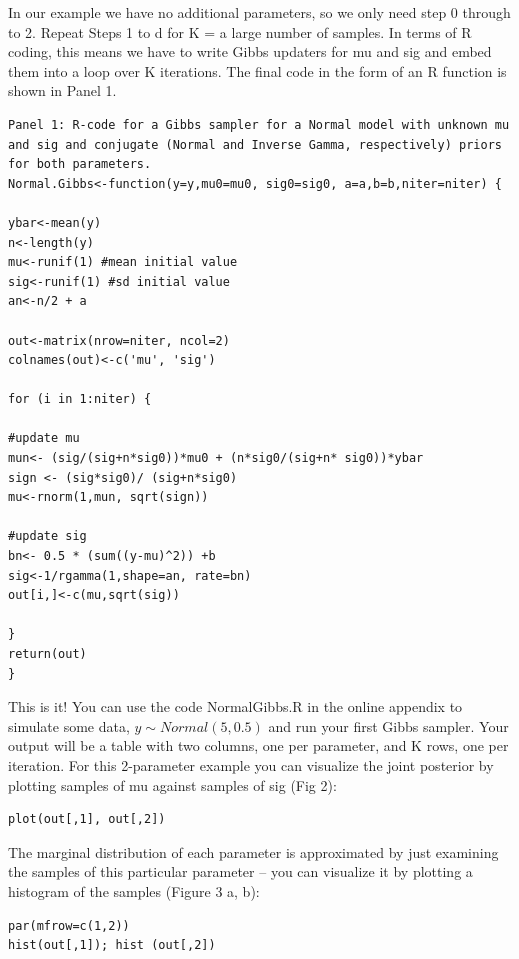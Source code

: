 In our example we have no additional parameters, so we only need step 0 through to 2. 
Repeat Steps 1 to d for K = a large number of samples.
In terms of R coding, this means we have to write Gibbs updaters for mu and sig and embed them into a loop over K iterations. The final code in the form of an R function is shown in Panel 1.
\begin{verbatim}
Panel 1: R-code for a Gibbs sampler for a Normal model with unknown mu and sig and conjugate (Normal and Inverse Gamma, respectively) priors for both parameters.
Normal.Gibbs<-function(y=y,mu0=mu0, sig0=sig0, a=a,b=b,niter=niter) {

ybar<-mean(y)
n<-length(y)
mu<-runif(1) #mean initial value
sig<-runif(1) #sd initial value
an<-n/2 + a

out<-matrix(nrow=niter, ncol=2)
colnames(out)<-c('mu', 'sig')

for (i in 1:niter) {

#update mu
mun<- (sig/(sig+n*sig0))*mu0 + (n*sig0/(sig+n* sig0))*ybar 
sign <- (sig*sig0)/ (sig+n*sig0)
mu<-rnorm(1,mun, sqrt(sign))

#update sig
bn<- 0.5 * (sum((y-mu)^2)) +b
sig<-1/rgamma(1,shape=an, rate=bn)
out[i,]<-c(mu,sqrt(sig))

}
return(out)
}
\end{verbatim}

This is it! You can use the code NormalGibbs.R in the online appendix to simulate some data, $y \sim Normal (5, 0.5)$ and run your first Gibbs sampler. Your output will be a table with two columns, one per parameter, and K rows, one per iteration. For this 2-parameter example you can visualize the joint posterior by plotting samples of mu against samples of sig (Fig 2):
\begin{verbatim}
plot(out[,1], out[,2])
\end{verbatim}
The marginal distribution of each parameter is approximated by just examining the samples of this particular parameter – you can visualize it by plotting a histogram of the samples (Figure 3 a, b):
\begin{verbatim}
par(mfrow=c(1,2))
hist(out[,1]); hist (out[,2])
\end{verbatim}

